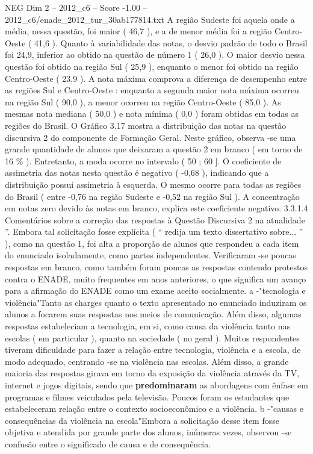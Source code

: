 \begin{textsample}{NEG Dim 2 – 2012\_c6 – Score -1.00 – 2012\_c6/enade\_2012\_tur\_30ab177814.txt}
A região Sudeste foi aquela onde a média, nessa questão, foi maior ( 46,7 ), e a de menor média foi a região Centro-Oeste ( 41,6 ).
Quanto à variabilidade das notas, o desvio padrão de todo o Brasil foi 24,9, inferior ao obtido na questão de número 1 ( 26,0 ).
O maior desvio nessa questão foi obtido na região Sul ( 25,9 ), enquanto o menor foi obtido na região Centro-Oeste ( 23,9 ).
A nota máxima comprova a diferença de desempenho entre as regiões Sul e Centro-Oeste : enquanto a segunda maior nota máxima ocorreu na região Sul ( 90,0 ), a menor ocorreu na região Centro-Oeste ( 85,0 ).
As mesmas nota mediana ( 50,0 ) e nota mínima ( 0,0 ) foram obtidas em todas as regiões do Brasil.
O Gráfico 3.17 mostra a distribuição das notas na questão discursiva 2 do componente de Formação Geral.
Neste gráfico, observa -se uma grande quantidade de alunos que deixaram a questão 2 em branco ( em torno de 16 \% ).
Entretanto, a moda ocorre no intervalo ( 50 ; 60 ].
O coeficiente de assimetria das notas nesta questão é negativo ( -0,68 ), indicando que a distribuição possui assimetria à esquerda.
O mesmo ocorre para todas as regiões do Brasil ( entre -0,76 na região Sudeste e -0,52 na região Sul ).
A concentração em notas zero devido às notas em branco, explica este coeficiente negativo. 3.3.1.4 Comentários sobre a correção das respostas à Questão Discursiva 2 na atualidade ”.
Embora tal solicitação fosse explícita ( “ redija um texto dissertativo sobre... ” ), como na questão 1, foi alta a proporção de alunos que respondeu a cada item do enunciado isoladamente, como partes independentes.
Verificaram -se poucas respostas em branco, como também foram poucas as respostas contendo protestos contra o ENADE, muito frequentes em anos anteriores, o que significa um avanço para a afirmação do ENADE como um exame aceito socialmente. a -"tecnologia e violência"Tanto as charges quanto o texto apresentado no enunciado induziram os alunos a focarem suas respostas nos meios de comunicação.
Além disso, algumas respostas estabeleciam a tecnologia, em si, como causa da violência tanto nas escolas ( em particular ), quanto na sociedade ( no geral ).
Muitos respondentes tiveram dificuldade para fazer a relação entre tecnologia, violência e a escola, de modo adequado, centrando -se na violência nas escolas.
Além disso, a grande maioria das respostas girava em torno da exposição da violência através da TV, internet e jogos digitais, sendo que \textbf{predominaram} as abordagens com ênfase em programas e filmes veiculados pela televisão.
Poucos foram os estudantes que estabeleceram relação entre o contexto socioeconômico e a violência. b -"causas e consequências da violência na escola"Embora a solicitação desse item fosse objetiva e atendida por grande parte dos alunos, inúmeras vezes, observou -se confusão entre o significado de causa e de consequência.

\end{textsample}

